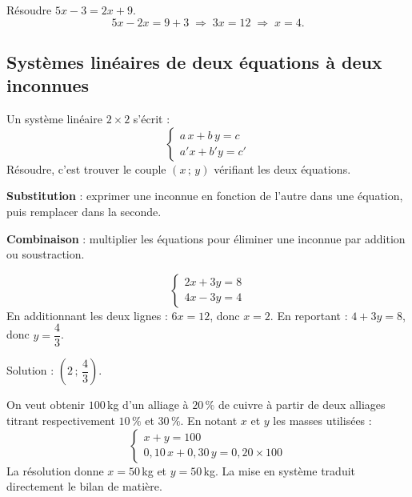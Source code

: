 \documentclass[a4paper,11pt]{article}
\begin{document}
\begin{exemple}
Résoudre $5x - 3 = 2x + 9$.
\[
5x - 2x = 9 + 3 \;\Longrightarrow\; 3x = 12 \;\Longrightarrow\; x = 4.
\]
\end{exemple}

\subsection{Systèmes linéaires de deux équations à deux inconnues}

\begin{definition}
Un système linéaire $2 \times 2$ s'écrit :
\[
\begin{cases} a\,x + b\,y = c \\ a'x + b'y = c' \end{cases}
\]
Résoudre, c'est trouver le couple $(x\,;\,y)$ vérifiant les deux équations.
\end{definition}

\begin{methode}
\textbf{Substitution} : exprimer une inconnue en fonction de l'autre dans une équation, puis remplacer dans la seconde.

\textbf{Combinaison} : multiplier les équations pour éliminer une inconnue par addition ou soustraction.
\end{methode}

\begin{exemple}
\[
\begin{cases} 2x + 3y = 8 \\ 4x - 3y = 4 \end{cases}
\]
En additionnant les deux lignes : $6x = 12$, donc $x = 2$. En reportant : $4 + 3y = 8$, donc $y = \dfrac{4}{3}$.

Solution : $\left(2\,;\,\dfrac{4}{3}\right)$.
\end{exemple}

\begin{appliindus}
On veut obtenir $100$\,kg d'un alliage à $20\,\%$ de cuivre à partir de deux alliages titrant respectivement $10\,\%$ et $30\,\%$. En notant $x$ et $y$ les masses utilisées :
\[
\begin{cases} x + y = 100 \\ 0{,}10\,x + 0{,}30\,y = 0{,}20 \times 100 \end{cases}
\]
La résolution donne $x = 50$\,kg et $y = 50$\,kg. La mise en système traduit directement le bilan de matière.
\end{appliindus}
\end{document}
